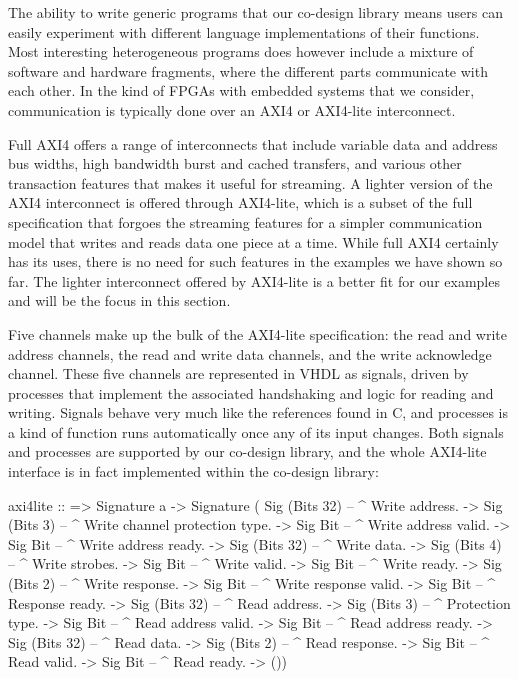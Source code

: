 \documentclass[../paper.tex]{subfiles}
\begin{document}
The ability to write generic programs that our co-design library means users can easily experiment with different language implementations of their functions. Most interesting heterogeneous programs does however include a mixture of software and hardware fragments, where the different parts communicate with each other. In the kind of FPGAs with embedded systems that we consider, communication is typically done over an AXI4 or AXI4-lite interconnect. 

Full AXI4 offers a range of interconnects that include variable data and address bus widths, high bandwidth burst and cached transfers, and various other transaction features that makes it useful for streaming. A lighter version of the AXI4 interconnect is offered through AXI4-lite, which is a subset of the full specification that forgoes the streaming features for a simpler communication model that writes and reads data one piece at a time. While full AXI4 certainly has its uses, there is no need for such features in the examples we have shown so far. The lighter interconnect offered by AXI4-lite is a better fit for our examples and will be the focus in this section.


Five channels make up the bulk of the AXI4-lite specification: the read and write address channels, the read and write data channels, and the write acknowledge channel. These five channels are represented in VHDL as signals, driven by processes that implement the associated handshaking and logic for reading and writing. Signals behave very much like the references found in C, and processes is a kind of function runs automatically once any of its input changes. Both signals and processes are supported by our co-design library, and the whole AXI4-lite interface is in fact implemented within the co-design library:


\begin{code}
axi4lite ::
  => Signature a
  -> Signature (
          Sig (Bits 32) -- ^ Write address.
       -> Sig (Bits 3)  -- ^ Write channel protection type.
       -> Sig Bit       -- ^ Write address valid.
       -> Sig Bit       -- ^ Write address ready.
       -> Sig (Bits 32) -- ^ Write data.
       -> Sig (Bits 4)  -- ^ Write strobes.
       -> Sig Bit       -- ^ Write valid.
       -> Sig Bit       -- ^ Write ready.
       -> Sig (Bits 2)  -- ^ Write response.
       -> Sig Bit       -- ^ Write response valid.
       -> Sig Bit       -- ^ Response ready.
       -> Sig (Bits 32) -- ^ Read address.
       -> Sig (Bits 3)  -- ^ Protection type.
       -> Sig Bit       -- ^ Read address valid.
       -> Sig Bit       -- ^ Read address ready.
       -> Sig (Bits 32) -- ^ Read data.
       -> Sig (Bits 2)  -- ^ Read response.
       -> Sig Bit       -- ^ Read valid.
       -> Sig Bit       -- ^ Read ready.    
       -> ())
\end{code}
\end{document}
